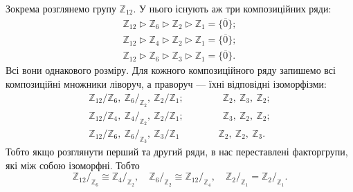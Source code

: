 \documentclass{math_library}
\begin{document}
\begin{example}
Зокрема розглянемо групу $\mathbb{Z}_{12}$. У нього існують аж три композиційних ряди:
\begin{align*}
\mathbb{Z}_{12} \triangleright \mathbb{Z}_6 \triangleright \mathbb{Z}_2 \triangleright \mathbb{Z}_1 = \{\overline{0}\}; \\
\mathbb{Z}_{12} \triangleright \mathbb{Z}_4 \triangleright \mathbb{Z}_2 \triangleright \mathbb{Z}_1 = \{\overline{0}\}; \\
\mathbb{Z}_{12} \triangleright \mathbb{Z}_6 \triangleright \mathbb{Z}_3 \triangleright \mathbb{Z}_1 = \{\overline{0}\}.
\end{align*}
Всі вони однакового розміру. Для кожного композиційного ряду запишемо всі композиційні множники ліворуч, а праворуч --- їхні  відповідні ізоморфізми:
\begin{align*}
{\mathbb{Z}_{12}}/{\mathbb{Z}_6},\ {\mathbb{Z}_6}/_{\mathbb{Z}_2},\ {\mathbb{Z}_2}/{\mathbb{Z}_1}; \qquad\qquad \mathbb{Z}_2,\ \mathbb{Z}_3,\ \mathbb{Z}_2;\\
{\mathbb{Z}_{12}}/{\mathbb{Z}_4},\ {\mathbb{Z}_4}/_{\mathbb{Z}_2},\ {\mathbb{Z}_2}/{\mathbb{Z}_1}; \qquad\qquad \mathbb{Z}_3,\ \mathbb{Z}_2,\ \mathbb{Z}_2;\\
{\mathbb{Z}_{12}}/{\mathbb{Z}_6},\ {\mathbb{Z}_6}/_{\mathbb{Z}_3},\ {\mathbb{Z}_3}/{\mathbb{Z}_1} \qquad\qquad \mathbb{Z}_2,\ \mathbb{Z}_2,\ \mathbb{Z}_3.
\end{align*}
Тобто якщо розглянути перший та другий ряди, в нас переставлені факторгрупи, які між собою ізоморфні. Тобто 
\[
{\mathbb{Z}_{12}}/_{\mathbb{Z}_6} \cong {\mathbb{Z}_{4}}/_{\mathbb{Z}_2},\quad {\mathbb{Z}_{6}}/_{\mathbb{Z}_2} \cong {\mathbb{Z}_{12}}/_{\mathbb{Z}_4},\quad {\mathbb{Z}_{2}}/_{\mathbb{Z}_1} = {\mathbb{Z}_{2}}/_{\mathbb{Z}_1}.
\]
\end{example}
\end{document}
